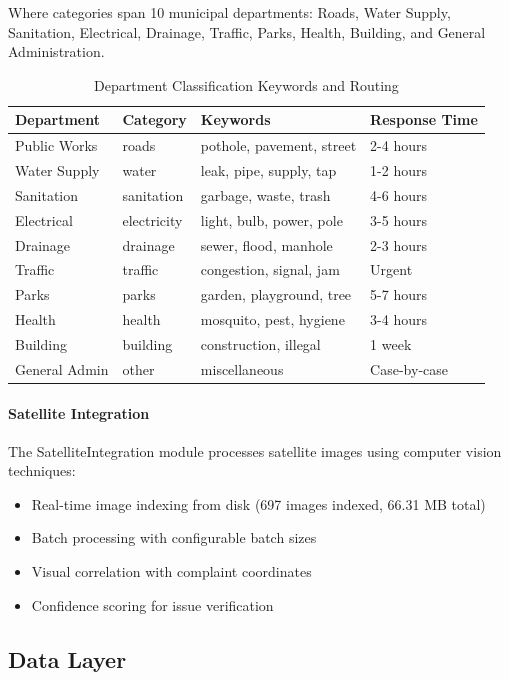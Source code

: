 \documentclass[11pt,a4paper]{article}
\begin{document}
Where categories span 10 municipal departments: Roads, Water Supply, Sanitation, Electrical, Drainage, Traffic, Parks, Health, Building, and General Administration.

\begin{table}[H]
\centering
\caption{Department Classification Keywords and Routing}
\label{tab:dept_keywords}
\begin{tabular}{|l|l|l|l|}
\hline
\textbf{Department} & \textbf{Category} & \textbf{Keywords} & \textbf{Response Time} \\
\hline
Public Works & roads & pothole, pavement, street & 2-4 hours \\
Water Supply & water & leak, pipe, supply, tap & 1-2 hours \\
Sanitation & sanitation & garbage, waste, trash & 4-6 hours \\
Electrical & electricity & light, bulb, power, pole & 3-5 hours \\
Drainage & drainage & sewer, flood, manhole & 2-3 hours \\
Traffic & traffic & congestion, signal, jam & Urgent \\
Parks & parks & garden, playground, tree & 5-7 hours \\
Health & health & mosquito, pest, hygiene & 3-4 hours \\
Building & building & construction, illegal & 1 week \\
General Admin & other & miscellaneous & Case-by-case \\
\hline
\end{tabular}
\end{table}

\paragraph{Satellite Integration} The SatelliteIntegration module processes satellite images using computer vision techniques:
\begin{itemize}
    \item Real-time image indexing from disk (697 images indexed, 66.31 MB total)
    \item Batch processing with configurable batch sizes
    \item Visual correlation with complaint coordinates
    \item Confidence scoring for issue verification
\end{itemize}

\subsection{Data Layer}
\end{document}
